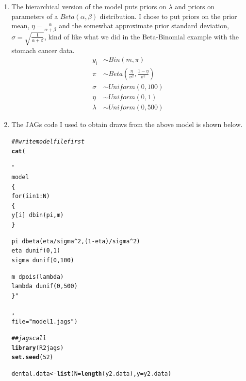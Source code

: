 \documentclass[12pt]{article}\usepackage[]{graphicx}\usepackage[]{color}
\makeatletter
\newcommand{\hlnum}[1]{\textcolor[rgb]{0.686,0.059,0.569}{#1}}%
\newcommand{\hlstr}[1]{\textcolor[rgb]{0.192,0.494,0.8}{#1}}%
\newcommand{\hlcom}[1]{\textcolor[rgb]{0.678,0.584,0.686}{\textit{#1}}}%
\newcommand{\hlstd}[1]{\textcolor[rgb]{0.345,0.345,0.345}{#1}}%
\newcommand{\hlkwb}[1]{\textcolor[rgb]{0.69,0.353,0.396}{#1}}%
\newcommand{\hlkwc}[1]{\textcolor[rgb]{0.333,0.667,0.333}{#1}}%
\newcommand{\hlkwd}[1]{\textcolor[rgb]{0.737,0.353,0.396}{\textbf{#1}}}%
\newenvironment{kframe}{%
 \def\at@end@of@kframe{}%
 \ifinner\ifhmode%
  \def\at@end@of@kframe{\end{minipage}}%
  \begin{minipage}{\columnwidth}%
 \fi\fi%
 \def\FrameCommand##1{\hskip\@totalleftmargin \hskip-\fboxsep
 \colorbox{shadecolor}{##1}\hskip-\fboxsep
     \hskip-\linewidth \hskip-\@totalleftmargin \hskip\columnwidth}%
 \MakeFramed {\advance\hsize-\width
   \@totalleftmargin\z@ \linewidth\hsize
   \@setminipage}}%
 {\par\unskip\endMakeFramed%
 \at@end@of@kframe}
\newenvironment{knitrout}{}{} %
\makeatother
\begin{document}
\begin{enumerate}
\begin{enumerate}
\item The hierarchical version of the model puts priors on $\lambda$ and priors on parameters of a $Beta(\alpha, \beta)$ distribution. I chose to put priors on the prior mean, $\eta = \frac{\alpha}{\alpha+\beta}$ and the somewhat approximate prior standard deviation, $\sigma = \sqrt{\frac{1}{\alpha + \beta}}$, kind of like what we did in the Beta-Binomial example with the stomach cancer data.
\begin{align*}
y_i &\sim Bin(m, \pi) \\
\pi &\sim Beta(\frac{\eta}{\sigma^2}, \frac{1-\eta}{\sigma^2}) \\
\sigma &\sim Uniform(0, 100) \\
\eta &\sim Uniform(0, 1) \\
\lambda &\sim Uniform(0, 500)
\end{align*}

\item The JAGs code I used to obtain draws from the above model is shown below.

\begin{knitrout}\footnotesize
{}\color{fgcolor}\begin{kframe}
\begin{alltt}
\hlcom{##write model file first}
\hlkwd{cat}\hlstd{(}\hlstr{"
model
\{
for(i in 1:N)
\{
y[i] ~ dbin(pi, m)
\}

pi ~ dbeta(eta/sigma^2, (1-eta)/sigma^2)
eta ~ dunif(0, 1)
sigma ~ dunif(0, 100)

m ~ dpois(lambda)
lambda ~ dunif(0, 500)
\}"}\hlstd{,}
\hlkwc{file}\hlstd{=}\hlstr{"model1.jags"}\hlstd{)}
\end{alltt}
\end{kframe}
\end{knitrout}


\begin{knitrout}\footnotesize
{}\color{fgcolor}\begin{kframe}
\begin{alltt}
\hlcom{##jags call}
\hlkwd{library}\hlstd{(R2jags)}
\hlkwd{set.seed}\hlstd{(}\hlnum{52}\hlstd{)}


\hlstd{dental.data} \hlkwb{<-} \hlkwd{list}\hlstd{(}\hlkwc{N}\hlstd{=}\hlkwd{length}\hlstd{(y2.data),} \hlkwc{y}\hlstd{=y2.data)}


\end{alltt}
\end{kframe}
\end{knitrout}
\end{enumerate}
\end{enumerate}
\end{document}
